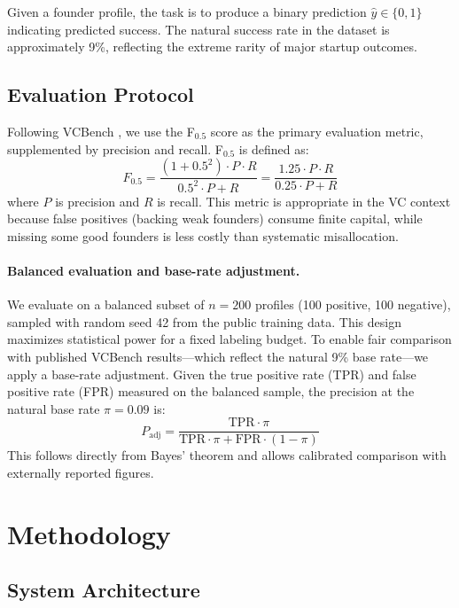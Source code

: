 \documentclass{article}
\begin{document}
Given a founder profile, the task is to produce a binary prediction $\hat{y} \in \{0, 1\}$ indicating predicted success. The natural success rate in the dataset is approximately 9\%, reflecting the extreme rarity of major startup outcomes.

\subsection{Evaluation Protocol}

Following VCBench \cite{chen2025vcbench}, we use the F$_{0.5}$ score as the primary evaluation metric, supplemented by precision and recall. F$_{0.5}$ is defined as:
\begin{equation}
  F_{0.5} = \frac{(1 + 0.5^2) \cdot P \cdot R}{0.5^2 \cdot P + R} = \frac{1.25 \cdot P \cdot R}{0.25 \cdot P + R}
\end{equation}
where $P$ is precision and $R$ is recall. This metric is appropriate in the VC context because false positives (backing weak founders) consume finite capital, while missing some good founders is less costly than systematic misallocation.

\paragraph{Balanced evaluation and base-rate adjustment.} We evaluate on a balanced subset of $n = 200$ profiles (100 positive, 100 negative), sampled with random seed 42 from the public training data. This design maximizes statistical power for a fixed labeling budget. To enable fair comparison with published VCBench results---which reflect the natural 9\% base rate---we apply a base-rate adjustment. Given the true positive rate (TPR) and false positive rate (FPR) measured on the balanced sample, the precision at the natural base rate $\pi = 0.09$ is:
\begin{equation}
  P_{\text{adj}} = \frac{\text{TPR} \cdot \pi}{\text{TPR} \cdot \pi + \text{FPR} \cdot (1 - \pi)}
\end{equation}
This follows directly from Bayes' theorem and allows calibrated comparison with externally reported figures.

\section{Methodology}

\subsection{System Architecture}
\end{document}
